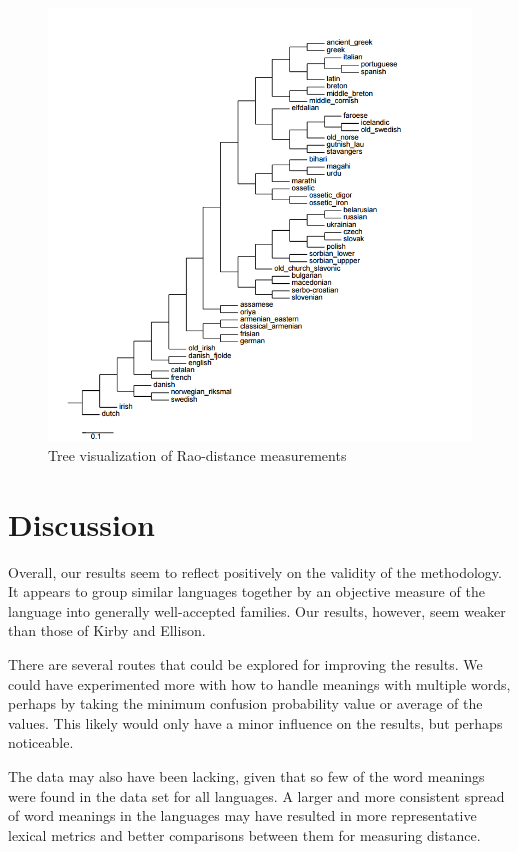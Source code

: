 \documentclass[10pt,a4]{article}
\begin{document}
\begin{figure}[ht]
	\centering
	\includegraphics[width=\linewidth]{tree2(2)}
	\caption{Tree visualization of Rao-distance measurements}
	\label{fig:raotree}
\end{figure}


\section{Discussion}

Overall, our results seem to reflect positively on the validity of the methodology.  It appears to group similar languages together by an objective measure of the language into generally well-accepted families.  Our results, however, seem weaker than those of Kirby and Ellison.

There are several routes that could be explored for improving the results.  We could have experimented more with how to handle meanings with multiple words, perhaps by taking the minimum confusion probability value or average of the values.  This likely would only have a minor influence on the results, but perhaps noticeable.

The data may also have been lacking, given that so few of the word meanings were found in the data set for all languages.  A larger and more consistent spread of word meanings in the languages may have resulted in more representative lexical metrics and better comparisons between them for measuring distance.
\end{document}
